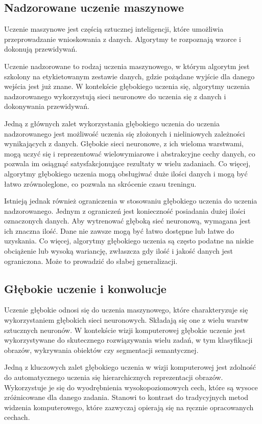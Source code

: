 \subsection{Nadzorowane uczenie maszynowe}

Uczenie maszynowe jest częścią sztucznej inteligencji, które umożliwia przeprowadzanie wnioskowania z danych. Algorytmy te rozpoznają wzorce i dokonują przewidywań.

Uczenie nadzorowane to rodzaj uczenia maszynowego, w którym algorytm jest szkolony na etykietowanym zestawie danych, gdzie pożądane wyjście dla danego wejścia jest już znane. W kontekście głębokiego uczenia się, algorytmy uczenia nadzorowanego wykorzystują sieci neuronowe do uczenia się z danych i dokonywania przewidywań.

Jedną z głównych zalet wykorzystania głębokiego uczenia do uczenia nadzorowanego jest możliwość uczenia się złożonych i nieliniowych zależności wynikających z danych. Głębokie sieci neuronowe, z ich wieloma warstwami, mogą uczyć się i reprezentować wielowymiarowe i abstrakcyjne cechy danych, co pozwala im osiągnąć satysfakcjonujące rezultaty w wielu zadaniach. Co więcej, algorytmy głębokiego uczenia mogą obsługiwać duże ilości danych i mogą być łatwo zrównoleglone, co pozwala na skrócenie czasu treningu.


Istnieją jednak również ograniczenia w stosowaniu głębokiego uczenia do uczenia nadzorowanego. Jednym z ograniczeń jest konieczność posiadania dużej ilości oznaczonych danych. Aby wytrenować głęboką sieć neuronową, wymagana jest ich znaczna ilość. Dane nie zawsze mogą być łatwo dostępne lub łatwe do uzyskania. Co więcej, algorytmy głębokiego uczenia są często podatne na niskie obciążenie lub wysoką wariancję, zwłaszcza gdy ilość i jakość danych jest ograniczona. Może to prowadzić do słabej generalizacji.
\subsection{Głębokie uczenie i konwolucje}
Uczenie głębokie odnosi się do uczenia maszynowego, które charakteryzuje się wykorzystaniem głębokich sieci neuronowych. Składają się one z wielu warstw sztucznych neuronów. W kontekście wizji komputerowej głębokie uczenie jest wykorzystywane do skutecznego rozwiązywania wielu zadań, w tym klasyfikacji obrazów, wykrywania obiektów czy segmentacji semantycznej.

Jedną z kluczowych zalet głębokiego uczenia w wizji komputerowej jest zdolność do automatycznego uczenia się hierarchicznych reprezentacji obrazów. Wykorzystuje je się do wyodrębnienia wysokopoziomowych cech, które są wysoce zróżnicowane dla danego zadania. Stanowi to kontrast do tradycyjnych metod widzenia komputerowego, które zazwyczaj opierają się na ręcznie opracowanych cechach.

